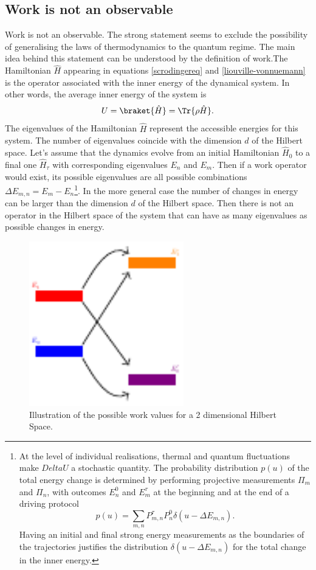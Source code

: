 \subsection*{Work is not an observable}
Work is not an observable\cite{PhysRevE.75.050102}. The strong statement seems to exclude the possibility of generalising the laws of thermodynamics to the quantum regime. The main idea behind this statement can be understood by the definition of work.The Hamiltonian $\hat{H}$ appearing in equations \eqref{scrodingereq} and \eqref{liouville-vonnuemann} is the operator associated with the inner energy of the dynamical system. In other words, the average inner energy of the system is 
\begin{equation}
U=\braket{\hat{H}}=\Tr \{\rho\hat{H}\}.
\label{innerenergy}
\end{equation}
The eigenvalues of the Hamiltonian $\hat{H}$ represent the accessible energies for this system. The number of eigenvalues coincide with the dimension $d$ of the Hilbert space. Let's assume that the dynamics evolve from an initial Hamiltonian $\hat{H}_0$ to a final one $\hat{H}_\tau$ with corresponding eigenvalues $E_n$ and $E_m$. Then if a work operator would exist, its possible eigenvalues are all possible combinations $\Delta E_{m,n}=E_m-E_n$\footnote{At the level of individual realisations, thermal and quantum fluctuations make $	Delta U$ a stochastic quantity. The probability distribution $p(u)$ of the total energy change is determined by performing projective measurements $\Pi_m$ and $\Pi_n$, with outcomes $E_n^0$ and $E_m^\tau$ at the beginning and at the end of a driving protocol
\[p(u)=\sum_{m,n}P^{\tau}_{m,n}P^{0}_{n}\delta(u-\Delta E_{m,n}).\] 
 Having an initial and final strong energy measurements as the boundaries of the trajectories justifies the distribution $\delta(u-\Delta E_{m,n})$ for the total change in the inner energy.}.  In the more general case the number of changes in energy can be larger than the dimension $d$ of the Hilbert space. Then there is not an operator in the Hilbert space of the system that can have as many eigenvalues as possible changes in energy.
 \begin{figure}[h]
\centering
\includegraphics[width=0.6\textwidth]{Figures/energy.pdf}
\caption{Illustration of the possible work values for a 2 dimensional Hilbert Space.}
\label{energy}
\end{figure}
